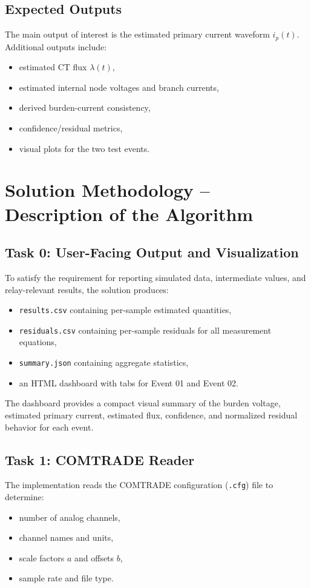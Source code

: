 \documentclass[11pt]{article}
\begin{document}
\subsection{Expected Outputs}
The main output of interest is the estimated primary current waveform $i_p(t)$. Additional outputs
include:
\begin{itemize}
  \item estimated CT flux $\lambda(t)$,
  \item estimated internal node voltages and branch currents,
  \item derived burden-current consistency,
  \item confidence/residual metrics,
  \item visual plots for the two test events.
\end{itemize}

\section{Solution Methodology -- Description of the Algorithm}
\subsection{Task 0: User-Facing Output and Visualization}
To satisfy the requirement for reporting simulated data, intermediate values, and relay-relevant
results, the solution produces:
\begin{itemize}
  \item \texttt{results.csv} containing per-sample estimated quantities,
  \item \texttt{residuals.csv} containing per-sample residuals for all measurement equations,
  \item \texttt{summary.json} containing aggregate statistics,
  \item an HTML dashboard with tabs for Event 01 and Event 02.
\end{itemize}
The dashboard provides a compact visual summary of the burden voltage, estimated primary current,
estimated flux, confidence, and normalized residual behavior for each event.

\subsection{Task 1: COMTRADE Reader}
The implementation reads the COMTRADE configuration (\texttt{.cfg}) file to determine:
\begin{itemize}
  \item number of analog channels,
  \item channel names and units,
  \item scale factors $a$ and offsets $b$,
  \item sample rate and file type.
\end{itemize}
\end{document}

